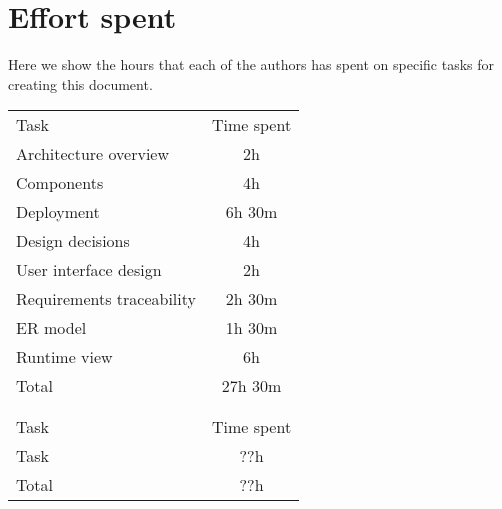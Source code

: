 \chapter{Effort spent}
Here we show the hours that each of the authors has spent on specific tasks
for creating this document.

\vspace{\baselineskip}\noindent
{
    \sffamily
    \begin{tabu} to \linewidth {l c}
        \rowfont{\bfseries}
         \\
        \toprule
        \rowfont{\bfseries}
        Task & Time spent \\
        \midrule
        Architecture overview & 2h \\
        Components & 4h \\
        Deployment & 6h 30m \\
        Design decisions & 4h \\
        User interface design & 2h \\
        Requirements traceability & 2h 30m \\
        ER model & 1h 30m \\
        Runtime view & 6h \\
        \bottomrule
        \rowfont{\bfseries}
        Total & 27h 30m \\
        \\
        \rowfont{\bfseries}
         \\
        \toprule
        \rowfont{\bfseries}
        Task & Time spent \\
        \midrule
        Task & ??h \\
        \bottomrule
        \rowfont{\bfseries}
        Total & ??h
    \end{tabu}
}